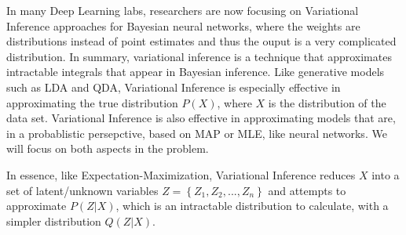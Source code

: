 

In many Deep Learning labs, researchers are now focusing on Variational Inference approaches for Bayesian neural networks, where the weights are distributions instead of point estimates and thus the ouput is a very complicated distribution. In summary, variational inference is a technique that approximates intractable integrals that appear in Bayesian inference. Like generative models such as LDA and QDA, Variational Inference is especially effective in approximating the true distribution $ P(X) $, where $ X $ is the distribution of the data set. Variational Inference is also effective in approximating models that are, in a probablistic persepctive, based on MAP or MLE, like neural networks. We will focus on both aspects in the problem.

In essence, like Expectation-Maximization, Variational Inference reduces $ X $ into a set of latent/unknown variables $ Z = \left\{ Z_1, Z_2, ..., Z_n \right\}$ and attempts to approximate $ P(Z|X) $, which is an intractable distribution to calculate, with a simpler distribution $ Q(Z|X) $.


